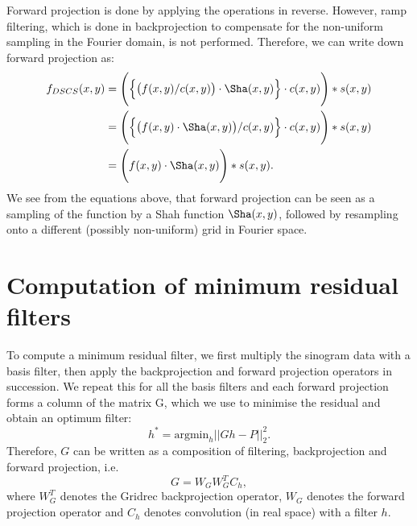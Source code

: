 \documentclass[11pt]{article}
\begin{document}
Forward projection is done by applying the operations in reverse. However, ramp filtering, which is done in backprojection to compensate for the non-uniform sampling in the Fourier domain, is not performed. Therefore, we can write down forward projection as:
{\color{gray}
\begin{align}
f_{DSCS}(x,y) &= \Bigg(\Big\{\big(f(x,y) / c(x,y)\big) \cdot \Sha(x,y)\Big\} \cdot c(x,y)\Bigg) \ast s(x,y) \\
&= \Bigg(\Big\{\big(f(x,y) \cdot \Sha(x,y)\big) / c(x,y) \Big\} \cdot c(x,y)\Bigg) \ast s(x,y) \\
&= \Bigg(f(x,y) \cdot \Sha(x,y) \Bigg) \ast s(x,y).
\end{align}
We see from the equations above, that forward projection can be seen as a sampling of the function by a Shah function $\Sha(x,y)$, followed by resampling onto a different (possibly non-uniform) grid in Fourier space.
}

\section{Computation of minimum residual filters}
To compute a minimum residual filter, we first multiply the sinogram data with a basis filter, then apply the backprojection and forward projection operators in succession. We repeat this for all the basis filters and each forward projection forms a column of the matrix G, which we use to minimise the residual and obtain an optimum filter:
\begin{equation}
h^\ast = \text{argmin}_h ||Gh - P||^2_2.
\end{equation}
Therefore, $G$ can be written as a composition of filtering, backprojection and forward projection, i.e.
\begin{equation}
G = W_G W^T_G C_h,
\end{equation}
where $W^T_G$ denotes the Gridrec backprojection operator, $W_G$ denotes the forward projection operator and $C_h$ denotes convolution (in real space) with a filter $h$. 
\end{document}
